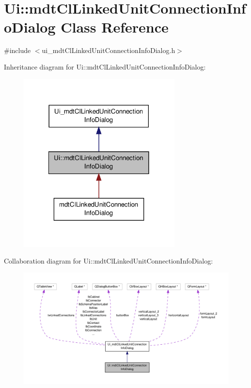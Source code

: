 \hypertarget{class_ui_1_1mdt_cl_linked_unit_connection_info_dialog}{\section{Ui\-:\-:mdt\-Cl\-Linked\-Unit\-Connection\-Info\-Dialog Class Reference}
\label{class_ui_1_1mdt_cl_linked_unit_connection_info_dialog}
}


{\ttfamily \#include $<$ui\-\_\-mdt\-Cl\-Linked\-Unit\-Connection\-Info\-Dialog.\-h$>$}



Inheritance diagram for Ui\-:\-:mdt\-Cl\-Linked\-Unit\-Connection\-Info\-Dialog\-:
\nopagebreak
\begin{figure}[H]
\begin{center}
\leavevmode
\includegraphics[width=234pt]{class_ui_1_1mdt_cl_linked_unit_connection_info_dialog__inherit__graph}
\end{center}
\end{figure}


Collaboration diagram for Ui\-:\-:mdt\-Cl\-Linked\-Unit\-Connection\-Info\-Dialog\-:
\nopagebreak
\begin{figure}[H]
\begin{center}
\leavevmode
\includegraphics[width=350pt]{class_ui_1_1mdt_cl_linked_unit_connection_info_dialog__coll__graph}
\end{center}
\end{figure}
